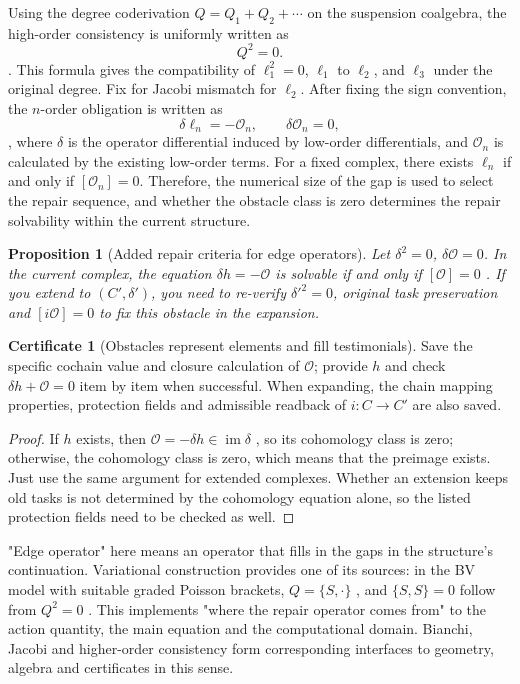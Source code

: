\documentclass[11pt,a4paper]{article}
\theoremstyle{plain}
\newtheorem{proposition}[theorem]{Proposition}
\theoremstyle{definition}
\newtheorem*{certificate}{Certificate}
\theoremstyle{remark}
\begin{document}
\begin{CJK*}
Using the degree coderivation $Q=Q_1+Q_2+\cdots$ on the suspension coalgebra, the high-order consistency is uniformly written as \[
 Q^2=0.
\]. This formula gives the compatibility of $\ell_1^2=0$, $\ell_1$ to $\ell_2$, and $\ell_3$ under the original degree. Fix for Jacobi mismatch for $\ell_2$. After fixing the sign convention, the $n$-order obligation is written as \[
 \delta \ell_n=-\mathcal O_n,\qquad \delta\mathcal O_n=0,
\], where $\delta$ is the operator differential induced by low-order differentials, and $\mathcal O_n$ is calculated by the existing low-order terms. For a fixed complex, there exists $\ell_n$ if and only if $[\mathcal O_n]=0$. Therefore, the numerical size of the gap is used to select the repair sequence, and whether the obstacle class is zero determines the repair solvability within the current structure. \cite{S07,S08,S09}

\begin{proposition}
[Added repair criteria for edge operators]\label{fa:prop-edge}
Let $\delta^2=0$, $\delta\mathcal O=0$. In the current complex, the equation $\delta h=-\mathcal O$ is solvable if and only if $[\mathcal O]=0$ . If you extend to $(C',\delta')$, you need to re-verify $\delta'^2=0$, original task preservation and $[i\mathcal O]=0$ to fix this obstacle in the expansion.\end{proposition}
\begin{certificate}
[Obstacles represent elements and fill testimonials]Save the specific cochain value and closure calculation of $\mathcal O$; provide $h$ and check $\delta h+\mathcal O=0$ item by item when successful. When expanding, the chain mapping properties, protection fields and admissible readback of $i:C\to C'$ are also saved.\end{certificate}
\begin{proof}
If $h$ exists, then $\mathcal O=-\delta h\in\operatorname{im}\delta$ , so its cohomology class is zero; otherwise, the cohomology class is zero, which means that the preimage exists. Just use the same argument for extended complexes. Whether an extension keeps old tasks is not determined by the cohomology equation alone, so the listed protection fields need to be checked as well.\end{proof}


"Edge operator" here means an operator that fills in the gaps in the structure's continuation. Variational construction provides one of its sources: in the BV model with suitable graded Poisson brackets, $Q=\{S,\cdot\}$ , and $\{S,S\}=0$ follow from $Q^2=0$ . This implements "where the repair operator comes from" to the action quantity, the main equation and the computational domain. Bianchi, Jacobi and higher-order consistency form corresponding interfaces to geometry, algebra and certificates in this sense. \cite{S08,S09}


\end{CJK*}
\end{document}
